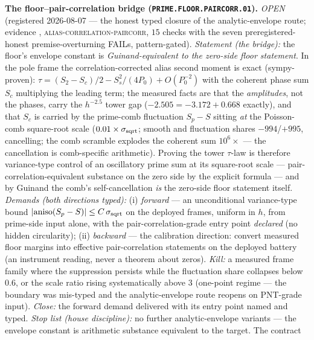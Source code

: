 \par\smallskip\noindent\textbf{The floor--pair-correlation bridge
(\texttt{PRIME.FLOOR.PAIRCORR.01}).}
{\sloppy
\emph{OPEN} (registered 2026-08-07 --- the honest typed closure
of the analytic-envelope route; evidence
,
\textsc{alias-correlation-paircorr}, $15$ checks with the seven
preregistered-honest premise-overturning FAILs, pattern-gated).
\emph{Statement (the bridge):} the floor's envelope constant is
\emph{Guinand-equivalent to the zero-side floor statement}.  In
the pole frame the correlation-corrected alias second moment is
exact (sympy-proven): $\tau = (S_2 - S_c)/2 - S_s^2/(4P_0) +
O(P_0^{-2})$ with the coherent phase sum $S_c$ multiplying the
leading term; the measured facts are that the \emph{amplitudes},
not the phases, carry the $h^{-2.5}$ tower gap ($-2.505 = -3.172
+ 0.668$ exactly), and that $S_c$ is carried by the prime-comb
fluctuation $S_p - S$ sitting \emph{at} the Poisson-comb
square-root scale ($0.01\times\sigma_{\rm sqrt}$; smooth and
fluctuation shares $-994$/$+995$, cancelling; the comb scramble
explodes the coherent sum $10^6\times$ --- the cancellation is
comb-specific arithmetic).  Proving the tower $\tau$-law is
therefore variance-type control of an oscillatory prime sum at
its square-root scale --- pair-correlation-equivalent substance
on the zero side by the explicit formula --- and by Guinand the
comb's self-cancellation \emph{is} the zero-side floor statement
itself.  \emph{Demands (both directions typed):} (i)
\emph{forward} --- an unconditional variance-type bound
$|{\rm aniso}(S_p - S)| \le C\,\sigma_{\rm sqrt}$ on the deployed
frames, uniform in $h$, from prime-side input alone, with the
pair-correlation-grade entry point \emph{declared} (no hidden
circularity); (ii) \emph{backward} --- the calibration direction:
convert measured floor margins into effective pair-correlation
statements on the deployed battery (an instrument reading, never
a theorem about zeros).  \emph{Kill:} a measured frame family
where the suppression persists while the fluctuation share
collapses below $0.6$, or the scale ratio rising systematically
above $3$ (one-point regime --- the boundary was mis-typed and
the analytic-envelope route reopens on PNT-grade input).
\emph{Close:} the forward demand delivered with its entry point
named and typed.  \emph{Stop list (house discipline):} no further
analytic-envelope variants --- the envelope constant is
arithmetic substance equivalent to the target.  The contract
}
